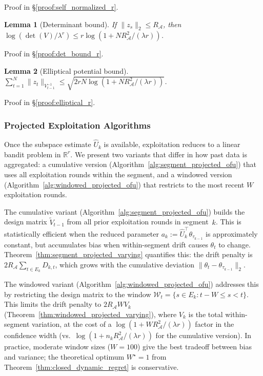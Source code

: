 \documentclass{article}
\newcommand{\R}{\mathbb{R}}
\newcommand{\cA}{\mathcal{A}}
\newtheorem{lemma}{Lemma}
\begin{document}
Proof in \S\ref{proof:self_normalized_r}.

\begin{lemma}[Determinant bound]
\label{lem:det_bound_r}
If $\|z_s\|_2\le R_{\cA}$, then $\log(\det(V)/\lambda^r) \le r\log(1+N R_{\cA}^2/(\lambda r))$.
\end{lemma}

Proof in \S\ref{proof:det_bound_r}.

\begin{lemma}[Elliptical potential bound]
\label{lem:elliptical_r}
$\sum_{t=1}^N \|z_t\|_{V_{t-1}^{-1}} \le \sqrt{2rN\log(1+N R_{\cA}^2/(\lambda r))}$.
\end{lemma}

Proof in \S\ref{proof:elliptical_r}.

\subsubsection{Projected Exploitation Algorithms}

  Once the subspace estimate $\widehat U_k$ is available, exploitation reduces to
  a linear bandit problem in $\R^r$.  We present two variants that differ in how
  past data is aggregated: a cumulative version (Algorithm~\ref{alg:segment_projected_ofu})
  that uses all exploitation rounds within the segment, and a windowed version
  (Algorithm~\ref{alg:windowed_projected_ofu}) that restricts to the most recent
  $W$ exploitation rounds.

  The cumulative variant (Algorithm~\ref{alg:segment_projected_ofu}) builds the
  design matrix $\widetilde V_{t-1}$ from all prior exploitation rounds in
  segment~$k$.  This is statistically efficient when the reduced parameter
  $a_k := \widehat U_k^\top \theta_{\tau_{k-1}}$ is approximately constant, but
  accumulates bias when within-segment drift causes $\theta_t$ to change.
  Theorem~\ref{thm:segment_projected_varying} quantifies this: the drift penalty
  is $2R_{\cA} \sum_{t \in E_k} D_{k,t}$, which grows with the cumulative deviation
  $\|\theta_t - \theta_{\tau_{k-1}}\|_2$.

  The windowed variant (Algorithm~\ref{alg:windowed_projected_ofu}) addresses this
  by restricting the design matrix to the window
  $\mathcal W_t = \{s \in E_k : t{-}W \le s < t\}$.
  This limits the drift penalty to $2R_{\cA} W V_k$ (Theorem~\ref{thm:windowed_projected_varying}),
  where $V_k$ is the total within-segment variation, at the cost of a
  $\log(1 + WR_{\cA}^2/(\lambda r))$ factor in the confidence width (vs.\
  $\log(1 + n_k R_{\cA}^2/(\lambda r))$ for the cumulative version).
  In practice, moderate window sizes ($W = 100$) give the best tradeoff
  between bias and variance; the theoretical optimum $W^\star = 1$ from
  Theorem~\ref{thm:closed_dynamic_regret} is conservative.
\end{document}
